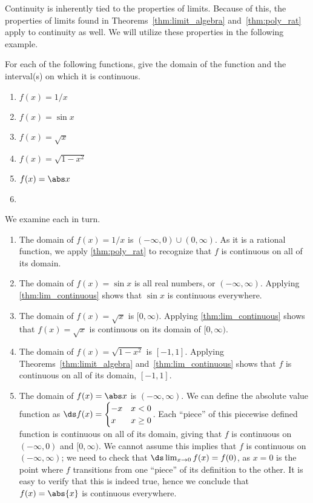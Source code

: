 Continuity is inherently tied to the properties of limits. Because of this, the properties of limits found in Theorems~\ref{thm:limit_algebra} and~\ref{thm:poly_rat}
apply to continuity as well. We will utilize these properties in the following example.

\begin{example}\label{ex_cont_funct1}%
For each of the following functions, give the domain of the function and the interval(s) on which it is continuous.
\begin{multicols}{2}
	\begin{enumerate}
		\item	$f(x) = 1/x$
		\item	$f(x) = \sin x$
		\item	$f(x) = \sqrt{x}$
		\item	$f(x) = \sqrt{1-x^2}$
		\item	$f(x) = \abs x$
		\item[]
	\end{enumerate}
\end{multicols}
\solution
We examine each in turn.
\begin{enumerate}
	\item	The domain of $f(x) = 1/x$ is $(-\infty,0) \cup (0,\infty)$. As it is a rational function, we apply \autoref{thm:poly_rat} to recognize that $f$ is continuous on all of its domain.
	\item	The domain of $f(x) = \sin x$ is all real numbers, or $(-\infty,\infty)$. Applying \autoref{thm:lim_continuous} shows that $\sin x$ is continuous everywhere.
	\item	The domain of $f(x) = \sqrt{x}$ is $[0,\infty)$. Applying \autoref{thm:lim_continuous} shows that $f(x) = \sqrt{x}$ is continuous on its domain of $[0,\infty)$.
	\item	The domain of $f(x) = \sqrt{1-x^2}$ is $[-1,1]$. Applying Theorems~\ref{thm:limit_algebra} and~\ref{thm:lim_continuous} shows that $f$ is continuous on all of its domain, $[-1,1]$.
	\item	The domain of $f(x) = \abs x$ is $(-\infty,\infty)$. We can define the absolute value function as $\ds f(x) = \begin{cases}-x & x<0 \\ x & x\geq 0\end{cases}$. Each ``piece'' of this piecewise defined function is continuous on all of its domain, giving that $f$ is continuous on $(-\infty,0)$ and $[0,\infty)$. We cannot assume this implies that $f$ is continuous on $(-\infty,\infty)$; we need to check that $\ds \lim_{x\to 0}f(x) = f(0)$, as $x=0$ is the point where $f$ transitions from one ``piece'' of its definition to the other. It is easy to verify that this is indeed true, hence we conclude that $f(x) = \abs{x}$ is continuous everywhere.
\end{enumerate}
\end{example}

